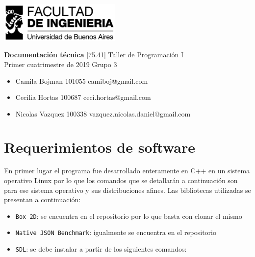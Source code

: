 \documentclass[a4paper]{article}
\newcommand{\materia}{[75.41] Taller de Programación I}
\newcommand{\trabajo}{Documentación técnica}
\newcommand{\cuatrimestre}{Primer cuatrimestre de 2019}
\newcommand{\grupo}{Grupo 3}
\begin{document}
	\setcounter{page}{1}
	
	\begin{titlepage}
		\hfill\includegraphics[width=6cm]{fiuba.jpeg}
		\begin{center}
			\vfill
			\Huge \textbf{\trabajo}
			\vskip2cm
			\Large \materia\\
			\cuatrimestre
			\vfill
			\grupo
			\begin{itemize}
				\item Camila Bojman 101055 camiboj@gmail.com
				\item Cecilia Hortas 100687 ceci.hortas@gmail.com
				\item Nicolas Vazquez 100338 vazquez.nicolas.daniel@gmail.com
			\end{itemize}
			\vskip1cm
		\end{center}
	\end{titlepage}

\section{Requerimientos de software}

En primer lugar el programa fue desarrollado enteramente en C++ en un sistema operativo Linux por lo que los comandos que se detallarán a continuación son para ese sistema operativo y sus distribuciones afines. Las bibliotecas utilizadas se presentan a continuación:

\begin{itemize}
	\item \texttt{Box 2D}: se encuentra en el repositorio por lo que basta con clonar el mismo
\end{itemize}

\begin{itemize}
	\item \texttt{Native JSON Benchmark}: igualmente se encuentra en el repositorio
\end{itemize}

\begin{itemize}
	\item \texttt{SDL}: se debe instalar a partir de los siguientes comandos:
\end{itemize}
\end{document}
